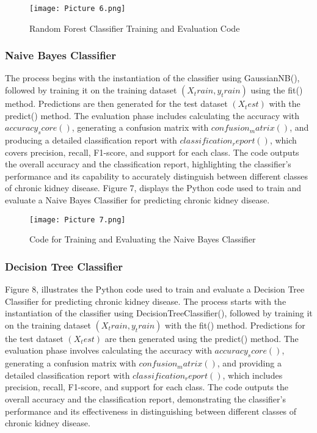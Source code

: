 \documentclass[conference]{IEEEtran}
\begin{document}
\begin{figure}
\centering
\texttt{[image: Picture 6.png]}
\caption{Random Forest Classifier Training and Evaluation Code} \label{fig6}
\end{figure}

\subsubsection{Naive Bayes Classifier} The process begins with the instantiation of the classifier using GaussianNB(), followed by training it on the training dataset \((X_train, y_train)\) using the fit() method. Predictions are then generated for the test dataset \((X_test)\) with the predict() method. The evaluation phase includes calculating the accuracy with \(accuracy_score()\), generating a confusion matrix with \(confusion_matrix()\), and producing a detailed classification report with \(classification_report()\), which covers precision, recall, F1-score, and support for each class. The code outputs the overall accuracy and the classification report, highlighting the classifier's performance and its capability to accurately distinguish between different classes of chronic kidney disease. Figure 7, displays the Python code used to train and evaluate a Naive Bayes Classifier for predicting chronic kidney disease. 

\begin{figure}
\centering
\texttt{[image: Picture 7.png]}
\caption{ Code for Training and Evaluating the Naive Bayes Classifier} \label{fig7}
\end{figure}

\subsubsection{Decision Tree Classifier} Figure 8, illustrates the Python code used to train and evaluate a Decision Tree Classifier for predicting chronic kidney disease. The process starts with the instantiation of the classifier using DecisionTreeClassifier(), followed by training it on the training dataset \((X_train, y_train)\) with the fit() method. Predictions for the test dataset \((X_test)\) are then generated using the predict() method. The evaluation phase involves calculating the accuracy with \(accuracy_score()\), generating a confusion matrix with \(confusion_matrix()\), and providing a detailed classification report with \(classification_report()\), which includes precision, recall, F1-score, and support for each class. The code outputs the overall accuracy and the classification report, demonstrating the classifier's performance and its effectiveness in distinguishing between different classes of chronic kidney disease.
\end{document}
